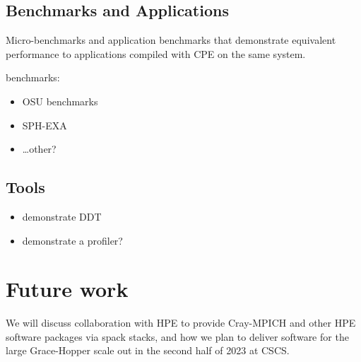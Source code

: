 \subsection{Benchmarks and Applications}


Micro-benchmarks and application benchmarks that demonstrate equivalent performance to applications compiled with CPE on the same system.


benchmarks:
\begin{itemize}
    \item OSU benchmarks 
    \item SPH-EXA 
    \item \dots other?
\end{itemize}

\subsection{Tools}


\begin{itemize}
    \item demonstrate DDT
    \item demonstrate a profiler?
\end{itemize}

\section{Future work}

We will discuss collaboration with HPE to provide Cray-MPICH and other HPE software packages via spack stacks, and how we plan to deliver software for the large Grace-Hopper scale out in the second half of 2023 at CSCS.

